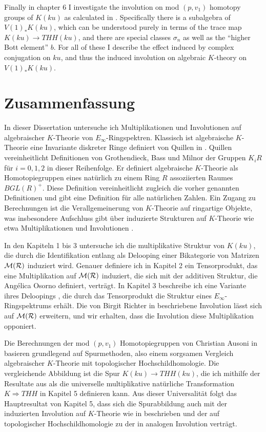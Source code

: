 \documentclass[12pt,bibliography=totoc,final]{scrbook} %
\begin{document}
Finally in chapter 6 I investigate the involution on mod $(p,v_1)$ homotopy groups of $K(ku)$ as 
calculated in \cite{AuKku}. Specifically there is a subalgebra of $V(1)_*K(ku)$, which can be
understood purely in terms of the trace map $K(ku)\rightarrow THH(ku)$, and there are special
classes $\sigma_n$ as well as the ``higher Bott element'' $b$. For all of these I describe
the effect induced by complex conjugation on $ku$, and thus the induced involution on 
algebraic $K$-theory on $V(1)_*K(ku)$. 

\section*{Zusammenfassung}
In dieser Dissertation untersuche ich Multiplikationen und Involutionen auf algebraischer
$K$-Theorie von $E_\infty$-Ringspektren. Klassisch ist algebraische $K$-Theorie
eine Invariante diskreter Ringe definiert von Quillen in \cite{Q1973}. Quillen
vereinheitlicht Definitionen von Grothendieck, Bass und Milnor der Gruppen $K_iR$ f\"ur
$i=0,1,2$ in dieser Reihenfolge. Er definiert algebraische $K$-Theorie als Homotopiegruppen
eines nat\"urlich zu einem Ring $R$ assoziierten Raumes $BGL(R)^+$. Diese Definition vereinheitlicht
zugleich die vorher genannten Definitionen und gibt eine Definition f\"ur alle
nat\"urlichen Zahlen. Ein Zugang zu Berechnungen ist die Verallgemeinerung
von $K$-Theorie auf ringartige Objekte, was insbesondere Aufschluss gibt \"uber
induzierte Strukturen auf $K$-Theorie wie etwa Multiplikationen \cite{EM,GGN,BGT,May2009}
und Involutionen \cite{Ri2010}.

In den Kapiteln 1 bis 3 untersuche ich die multiplikative Struktur von $K(ku)$, die
durch die Identifikation entlang \cite{BDRR2011} als Delooping einer Bikategorie von 
Matrizen $\mathcal{M}(\mathcal{R})$ induziert wird.
Genauer definiere ich in Kapitel 2 ein Tensorprodukt, das eine Multiplikation auf
$\mathcal{M}(\mathcal{R})$ induziert, die sich mit der additiven Struktur, die Ang\'elica Osorno \cite{Os}
definiert, vertr\"agt. In Kapitel 3 beschreibe ich eine Variante ihres Deloopings
\cite{Os}, die durch das Tensorprodukt die Struktur eines $E_\infty$-Ringspektrums erh\"alt. 
Die von Birgit Richter in \cite{Ri2010} beschriebene Involution l\"asst sich
auf $\mathcal{M}(\mathcal{R})$ erweitern, und wir erhalten, dass die Involution diese Multiplikation opponiert.

Die Berechnungen der mod $(p,v_1)$ Homotopiegruppen von Christian Ausoni in \cite{AuKku,AuTHH} basieren
grundlegend auf Spurmethoden, also einem sorgsamen Vergleich algebraischer $K$-Theorie mit topologischer
Hochschildhomologie. Die vergleichende Abbildung ist die Spur $K(ku)\rightarrow THH(ku)$, die ich 
mithilfe der Resultate aus \cite{BGT2013,BGT} als die universelle multiplikative nat\"urliche
Transformation $K\Rightarrow THH$ in Kapitel 5 definieren kann. Aus dieser Universalit\"at folgt
das Hauptresultat von Kapitel 5, dass sich die Spurabbildung auch mit der induzierten
Involution auf $K$-Theorie wie in \cite{Ri2010} beschrieben und der auf topologischer 
Hochschildhomologie zu der in \cite{Loday} analogen Involution vertr\"agt.
\end{document}
